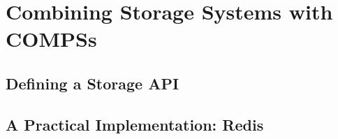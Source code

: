 \section{Combining Storage Systems with COMPSs}
\label{sec:storage}

\subsection{Defining a Storage API}
\label{subsec:storage_api}

\subsection{A Practical Implementation: Redis}
\label{subsec:storage_redis}